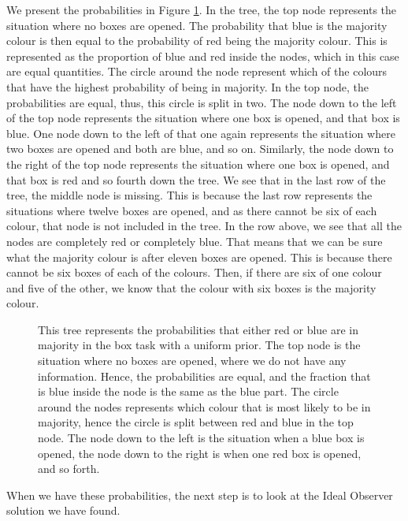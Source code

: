 We present the probabilities in Figure \ref{fig:probability_gamma_kappa_1}. In the tree, the top node represents the situation where no boxes are opened. The probability that blue is the majority colour is then equal to the probability of red being the majority colour. This is represented as the proportion of blue and red inside the nodes, which in this case are equal quantities. The circle around the node represent which of the colours that have the highest probability of being in majority. In the top node, the probabilities are equal, thus, this circle is split in two. The node down to the left of the top node represents the situation where one box is opened, and that box is blue. One node down to the left of that one again represents the situation where two boxes are opened and both are blue, and so on. Similarly, the node down to the right of the top node represents the situation where one box is opened, and that box is red and so fourth down the tree. We see that in the last row of the tree, the middle node is missing. This is because the last row represents the situations where twelve boxes are opened, and as there cannot be six of each colour, that node is not included in the tree. In the row above, we see that all the nodes are completely red or completely blue. That means that we can be sure what the majority colour is after eleven boxes are opened. This is because there cannot be six boxes of each of the colours. Then, if there are six of one colour and five of the other, we know that the colour with six boxes is the majority colour. 
\begin{figure}
    \centering
    \scalebox{0.4}{}
    \caption[The probabilities of majority colour plotted. $\gamma=\kappa=1$]{This tree represents the probabilities that either red or blue are in majority in the box task with a uniform prior. The top node is the situation where no boxes are opened, where we do not have any information. Hence, the probabilities are equal, and the fraction that is blue inside the node is the same as the blue part. The circle around the nodes represents which colour that is most likely to be in majority, hence the circle is split between red and blue in the top node. The node down to the left is the situation when a blue box is opened, the node down to the right is when one red box is opened, and so forth.}
    \label{fig:probability_gamma_kappa_1}
\end{figure}



When we have these probabilities, the next step is to look at the Ideal Observer solution we have found.





